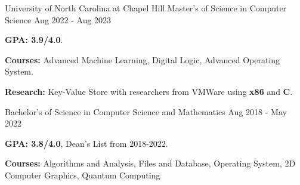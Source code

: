 

\begin{cventries}
    \cvedentry
      {University of North Carolina at Chapel Hill} %
      {Master's of Science in Computer Science} %
      {Aug 2022 - Aug 2023}
      {
        \begin{cvitems} %
          \item {\textbf{GPA: 3.9/4.0}. }
          \item {\textbf{Courses:} Advanced Machine Learning, Digital Logic, Advanced Operating System.}
          \item {\textbf{Research:} Key-Value Store with researchers from VMWare using \textbf{x86} and \textbf{C}.}
        \end{cvitems}
      }
      {Bachelor's of Science in Computer Science and Mathematics} %
      {Aug 2018 - May 2022} %
      {
        \begin{cvitems} %
          \item {\textbf{GPA: 3.8/4.0}, Dean's List from 2018-2022.}
          \item {\textbf{Courses:} Algorithms and Analysis, Files and Database, Operating System, 2D Computer Graphics, Quantum Computing}
        \end{cvitems}
      }
\end{cventries}
